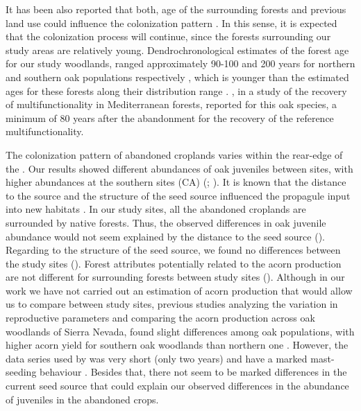 It has been also reported that both, age of the surrounding forests and previous land use could influence the colonization pattern \autocite{MinottaDegioanni2011NaturallyRegenerated}. In this sense, it is expected that the colonization process will continue, since the forests surrounding our study areas are relatively young. Dendrochronological estimates of the forest age for our study woodlands, ranged approximately 90-100 and 200 years for northern and southern oak populations respectively \autocite{PerezLuqueetal2020LanduseLegacies, GeaIzquierdoCanellas2014LocalClimate}, which is younger than the estimated ages for these forests along their distribution range \autocites{GeaIzquierdoCanellas2014LocalClimate}. \citet{CruzAlonsoetal2019LongTerm}, in a study of the recovery of multifunctionality in Mediterranean forests, reported for this oak species, a minimum of 80 years after the abandonment for the recovery of the reference multifunctionality. 

The colonization pattern of abandoned croplands varies within the rear-edge of the \Qp. Our results showed different abundances of oak juveniles between sites, with higher abundances at the southern sites (CA) (; ). It is known that the distance to the source and the structure of the seed source influenced the propagule input into new habitats \autocites{Nathan2006LongDistanceDispersal,HewittKellman2002TreeSeed,Kureketal2019DispersalDistance}. In our study sites, all the abandoned croplands are surrounded by native forests. Thus, the observed differences in oak juvenile abundance would not seem explained by the distance to the seed source (). Regarding to the structure of the seed source, we found no differences 
between the study sites (). Forest attributes potentially related to the acorn production \autocite[][\emph{e.g.} tree density, basal area,]{GeaIzquierdoetal2006AcornProduction} are not different for surrounding forests between study sites (). Although in our work we have not carried out an estimation of acorn production that would allow us to compare between study sites, previous studies analyzing the variation in reproductive parameters and comparing the acorn production across oak woodlands of Sierra Nevada, found slight differences among oak populations, with higher acorn yield for southern oak woodlands than northern one \autocite{Leal2013AnalisisCrecimiento}.  However, the data series used by \citet{Leal2013AnalisisCrecimiento} was very short (only two years) and \Qpy have a marked mast-seeding behaviour \autocites{Bravoetal2008SelviculturaMontes,Gomezetal2001ProblemasRegeneracion}. Besides that, there not seem to be marked differences in the current seed source that could explain our observed differences in the abundance of juveniles in the abandoned crops. 

